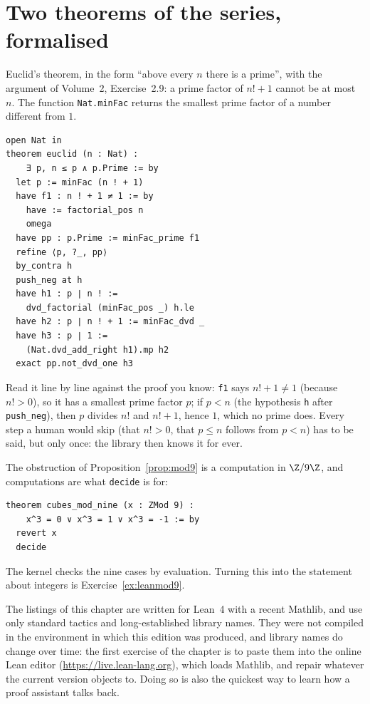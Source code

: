 \section{Two theorems of the series, formalised}

Euclid's theorem, in the form ``above every $n$ there is a prime'', with the argument of Volume~2, Exercise~2.9: a prime factor of $n!+1$ cannot be at most $n$. The function \texttt{Nat.minFac} returns the
smallest prime factor of a number different from $1$.
\begin{verbatim}
open Nat in
theorem euclid (n : Nat) :
    ∃ p, n ≤ p ∧ p.Prime := by
  let p := minFac (n ! + 1)
  have f1 : n ! + 1 ≠ 1 := by
    have := factorial_pos n
    omega
  have pp : p.Prime := minFac_prime f1
  refine ⟨p, ?_, pp⟩
  by_contra h
  push_neg at h
  have h1 : p ∣ n ! :=
    dvd_factorial (minFac_pos _) h.le
  have h2 : p ∣ n ! + 1 := minFac_dvd _
  have h3 : p ∣ 1 :=
    (Nat.dvd_add_right h1).mp h2
  exact pp.not_dvd_one h3
\end{verbatim}
Read it line by line against the proof you know: \texttt{f1} says $n!+1\ne1$ (because $n!>0$), so it has a smallest prime factor $p$; if $p<n$ (the hypothesis \texttt{h} after \texttt{push\_neg}),
then $p$ divides $n!$ and $n!+1$, hence $1$, which no prime does. Every step a human would skip (that $n!>0$, that $p\le n$ follows from $p<n$) has to be said, but only once:
the library then knows it for ever.

The obstruction of Proposition~\ref{prop:mod9} is a computation in $\Z/9\Z$, and computations are what \texttt{decide} is for:
\begin{verbatim}
theorem cubes_mod_nine (x : ZMod 9) :
    x^3 = 0 ∨ x^3 = 1 ∨ x^3 = -1 := by
  revert x
  decide
\end{verbatim}
The kernel checks the nine cases by evaluation. Turning this into the statement about integers is Exercise~\ref{ex:leanmod9}.

\begin{remark}\label{rem:leanlistings}
The listings of this chapter are written for Lean~4 with a recent Mathlib, and use only standard tactics and long-established library names. They were not compiled in the
environment in which this edition was produced, and library names do change over time: the first exercise of the chapter is to paste them into the online Lean editor
(\url{https://live.lean-lang.org}), which loads Mathlib, and repair whatever the current version objects to. Doing so is also the quickest way to learn how a proof assistant talks back.
\end{remark}

